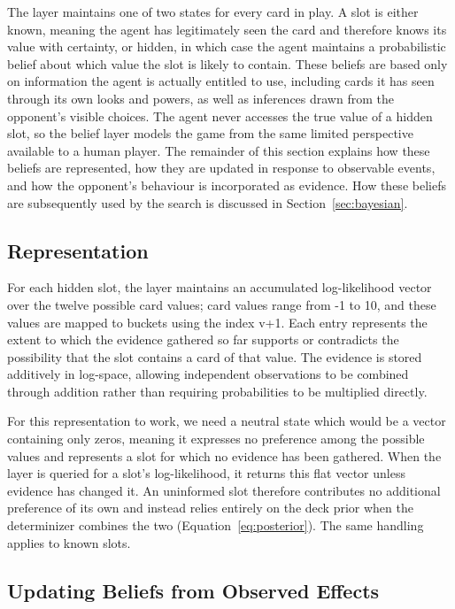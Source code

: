 \documentclass[12pt,a4paper,oneside]{report}
\begin{document}
The layer maintains one of two states for every card in play. A slot is either known,
meaning the agent has legitimately seen the card and therefore knows its value with
certainty, or hidden, in which case the agent maintains a probabilistic belief about
which value the slot is likely to contain. These beliefs are based only on information
the agent is actually entitled to use, including cards it has seen through its own looks
and powers, as well as inferences drawn from the opponent's visible choices. The agent
never accesses the true value of a hidden slot, so the belief layer models the game from
the same limited perspective available to a human player. The remainder of this section
explains how these beliefs are represented, how they are updated in response to
observable events, and how the opponent's behaviour is incorporated as evidence. How
these beliefs are subsequently used by the search is discussed in
Section~\ref{sec:bayesian}.

\subsection{Representation}

For each hidden slot, the layer maintains an accumulated log-likelihood vector over the twelve possible card values; card values range from -1 to 10, and these values are mapped to buckets using the index v+1. Each entry represents the extent to which the evidence gathered so far supports or contradicts the possibility that the slot contains a card of that value. The evidence is stored additively in log-space, allowing independent observations to be combined through addition rather than requiring probabilities to be multiplied directly.

For this representation to work, we need a neutral state which would be a vector containing only zeros, meaning it expresses no preference among the possible values and represents a slot for which no evidence has been gathered. When the layer is queried for a slot's log-likelihood, it returns this flat vector unless evidence has changed it. An uninformed slot therefore contributes no additional preference of its own and instead relies entirely on the deck prior when the determinizer combines the two (Equation~\ref{eq:posterior}). The same handling applies to known slots.

\subsection{Updating Beliefs from Observed Effects}
\end{document}
